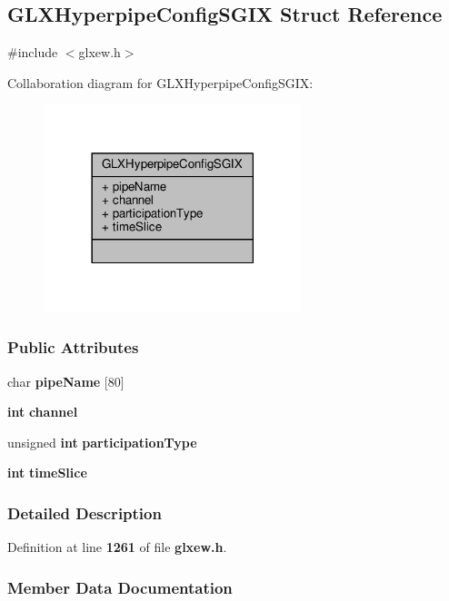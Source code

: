 \subsection{G\+L\+X\+Hyperpipe\+Config\+S\+G\+IX Struct Reference}
\label{structGLXHyperpipeConfigSGIX}


{\ttfamily \#include $<$glxew.\+h$>$}



Collaboration diagram for G\+L\+X\+Hyperpipe\+Config\+S\+G\+IX\+:
\nopagebreak
\begin{figure}[H]
\begin{center}
\leavevmode
\includegraphics[width=213pt]{dd/d08/structGLXHyperpipeConfigSGIX__coll__graph}
\end{center}
\end{figure}
\subsubsection*{Public Attributes}
\begin{DoxyCompactItemize}
\item 
char {\bf pipe\+Name} [80]
\item 
{\bf int} {\bf channel}
\item 
unsigned {\bf int} {\bf participation\+Type}
\item 
{\bf int} {\bf time\+Slice}
\end{DoxyCompactItemize}


\subsubsection{Detailed Description}


Definition at line {\bf 1261} of file {\bf glxew.\+h}.



\subsubsection{Member Data Documentation}
